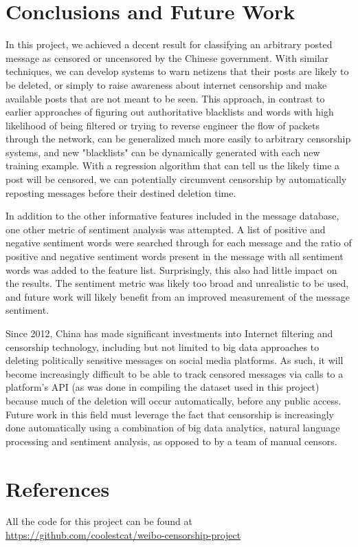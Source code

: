\documentclass{article} %
\begin{document}
\begin{CJK*}{UTF8}{gbsn}
\section{Conclusions and Future Work}
In this project, we achieved a decent result for classifying an arbitrary posted message as censored or uncensored by the Chinese government. With similar techniques, we can develop systems to warn netizens that their posts are likely to be deleted, or simply to raise awareness about internet censorship and make available posts that are not meant to be seen. This approach, in contrast to earlier approaches of figuring out authoritative blacklists and words with high likelihood of being filtered or trying to reverse engineer the flow of packets through the network, can be generalized much more easily to arbitrary censorship systems, and new "blacklists" can be dynamically generated with each new training example. With a regression algorithm that can tell us the likely time a post will be censored, we can potentially circumvent censorship by automatically reposting messages before their destined deletion time.  

In addition to the other informative features included in the message database, one other metric of sentiment analysis was attempted. A list of positive and negative sentiment words were searched through for each message and the ratio of positive and negative sentiment words present in the message with all sentiment words was added to the feature list. Surprisingly, this also had little impact on the results. The sentiment metric was likely too broad and unrealistic to be used, and future work will likely benefit from an improved measurement of the message sentiment. 

Since 2012, China has made significant investments into Internet filtering and censorship technology, including but not limited to big data approaches to deleting politically sensitive messages on social media platforms. As such, it will become increasingly difficult to be able to track censored messages via calls to a platform's API (as was done in compiling the dataset used in this project) because much of the deletion will occur automatically, before any public access. Future work in this field must leverage the fact that censorship is increasingly done automatically using a combination of big data analytics, natural language processing and sentiment analysis, as opposed to by a team of manual censors. 

\section{References}
All the code for this project can be found at \url{https://github.com/coolestcat/weibo-censorship-project}


\end{CJK*}
\end{document}
